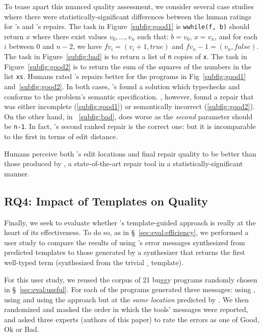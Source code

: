 %
To tease apart this nuanced quality assessment, 
we consider several case studies where there were 
statistically-significant differences between 
the human ratings for \toolname's and \seminal's 
repairs. 
%
The task in Figure~\ref{subfig:good1} is  
\texttt{wwhile(f, b)} should return $x$ where
there exist values $v_0,...,v_n$ such that:
$b = v_0$, $x = v_n$, and for each $i$ between 
0 and $n-2$, we have $f v_i = (v_i+1, true)$
and $f v_n-1 = (v_n, false)$.
%
The task in Figure~\ref{subfig:bad} is to 
return a list of \texttt{n} copies of \texttt{x}.
%
The task in Figure~\ref{subfig:good2} is to 
return the sum of the squares of the numbers 
in the list \texttt{xs}.
%
Humans rated \toolname's repairs better 
for the programs in Fig~\ref{subfig:good1}
and~\ref{subfig:good2}.
%
In both cases, \toolname's found a solution 
which typechecks and conforms to the problem's 
semantic specification. 
%
\seminal, however, found a repair that was 
either incomplete (\ref{subfig:good1}) or 
semantically incorrect (\ref{subfig:good2}). 
On the other hand, in ~\ref{subfig:bad}, \toolname 
does worse as the \emph{second} parameter should 
be \verb|n-1|. In fact, \toolname's second ranked 
repair is the correct one: but it is incomparable 
to the first in terms of edit distance.

\begin{framed}
\noindent Humans perceive both \toolname's edit locations
 and final repair quality to be better than those produced
 by \seminal, a state-of-the-art \ocaml repair tool in a
 statistically-significant manner.
\end{framed}

\subsection{RQ4: Impact of Templates on Quality}

Finally, we seek to evaluate whether \toolname's template-guided 
approach is really at the heart of its effectiveness. To do so, 
as in \S~\ref{sec:eval:efficiency}, we performed a user study 
to compare the results of using \toolname's error messages 
synthesized from predicted templates to those generated by 
a \naive synthesizer that returns the first well-typed term 
(\ie synthesized from the trivial $\_$ template). 

%
For this user study, we reused the corpus of 21 buggy programs 
randomly chosen in \S~\ref{sec:eval:useful}. For each of the 
programs generated three messages: using \toolname, using \seminal 
and using the \naive approach but at the \emph{same location} predicted
by \toolname. We then randomized and masked the order in which the tools' 
messages were reported, and asked three experts (authors of this paper)
to rate the errors as one of Good, Ok or Bad.

